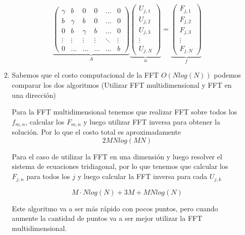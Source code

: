 \documentclass[spanish]{article}
\begin{document}
\begin{enumerate}
\begin{enumerate}
        \begin{equation}
            \underbrace{\begin{pmatrix}
                \gamma &b & 0 & 0 &\dots & 0\\
                b & \gamma & b & 0 &\dots & 0 \\
                0 & b & \gamma & b & \dots & 0\\
                \vdots & \vdots & \vdots &\vdots & \ddots & \vdots \\
                0 &\dots  &\dots  &\dots & \dots & b 
            \end{pmatrix}}_{A}
            \underbrace{\begin{pmatrix}
               U_{j,1}\\
               U_{j,2}\\
               U_{j,3}\\
               \vdots \\
               U_{j,N}
            \end{pmatrix}}_{u}
            = 
            \underbrace{\begin{pmatrix}
               F_{j,1}\\
               F_{j,2}\\
               F_{j,3}\\
               \vdots \\
               F_{j,N}
            \end{pmatrix}}_{f}   
        \end{equation}
        
        \item Sabemos que el costo computacional de la FFT $O(N log(N))$ podemos comparar los dos algoritmos (Utilizar FFT multidimensional y FFT en una dirección)
        
        Para la FFT multidimensional tenemos que realizar FFT sobre todos los $f_{m,n}$, calcular los $F_{m,n}$ y luego utilizar FFT inversa para obtener la solución. Por lo que el costo total es aproximadamente 
        $$ 2 MN log(MN)$$
        
        Para el caso de utilizar la FFT en una dimensión y luego resolver el sistema de ecuaciones tridiagonal, por lo que tenemos que calcular los $F_{j,n}$ para todos los $j$ y luego calcular la FFT inversa para cada $U_{j,k}$
        
        $$ M\cdot N log(N)  + 3 M + MNlog(N)$$
        
        Este algoritmo va a ser más rápido con pocos puntos, pero cuando aumente la cantidad de puntos va a ser mejor utilizar la FFT multidimensional.
        
    \end{enumerate}
    
  \end{enumerate}
  
\end{document}
